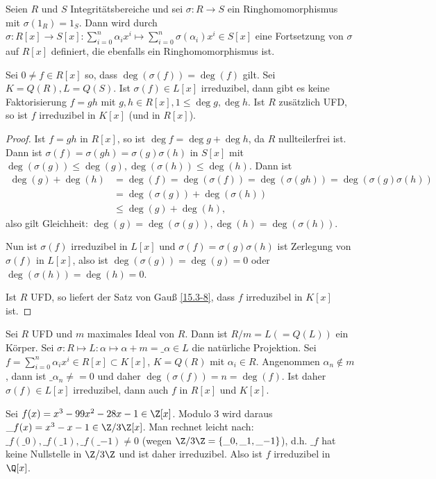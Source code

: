 \begin{st}[Reduktionskriterium] \label{15.3-12}
	Seien $R$ und $S$ Integritätsbereiche und sei $\sigma: R \to S$ ein Ringhomomorphismus mit $\sigma(1_R) = 1_S$.
	Dann wird durch $\sigma: R[x] \to S[x] : \sum_{i=0}^n \alpha_i x^i \mapsto \sum_{i=0}^n \sigma(\alpha_i) x^i \in S[x]$ eine Fortsetzung von $\sigma$ auf $R[x]$ definiert, die ebenfalls ein Ringhomomorphismus ist.

	Sei $0 \neq f \in R[x]$ so, dass $\deg(\sigma(f)) = \deg(f)$ gilt.
	Sei $K = Q(R), L = Q(S)$.
	Ist $\sigma(f) \in L[x]$ irreduzibel, dann gibt es keine Faktorisierung $f = gh$ mit $g, h \in R[x], 1 \le \deg g, \deg h$.
	Ist $R$ zusätzlich UFD, so ist $f$ irreduzibel in $K[x]$ (und in $R[x]$).
	\begin{proof}
		Ist $f = gh$ in $R[x]$, so ist $\deg f = \deg g + \deg h$, da $R$ nullteilerfrei ist.
		Dann ist $\sigma(f) = \sigma(gh) = \sigma(g)\sigma(h)$ in $S[x]$ mit $\deg(\sigma(g)) \le \deg(g), \deg(\sigma(h)) \le \deg(h)$.
		Dann ist
		\begin{align*}
			\deg(g) + \deg(h)
			&= \deg(f)
			= \deg(\sigma(f))
			= \deg(\sigma(gh))
			= \deg(\sigma(g)\sigma(h)) \\
			&= \deg(\sigma(g)) + \deg(\sigma(h)) \\
			&\le \deg(g) + \deg(h),
		\end{align*}
		also gilt Gleichheit: $\deg(g) = \deg(\sigma(g)), \deg(h) = \deg(\sigma(h))$.

		Nun ist $\sigma(f)$ irreduzibel in $L[x]$ und $\sigma(f) = \sigma(g)\sigma(h)$ ist Zerlegung von $\sigma(f)$ in $L[x]$, also ist $\deg(\sigma(g)) = \deg(g) = 0$ oder $\deg(\sigma(h)) = \deg(h) = 0$.

		Ist $R$ UFD, so liefert der Satz von Gauß \ref{15.3-8}, dass $f$ irreduzibel in $K[x]$ ist.
	\end{proof}
\end{st}

\begin{ex} \label{15.3-13}
	Sei $R$ UFD und $m$ maximales Ideal von $R$.
	Dann ist $R / m = L (= Q(L))$ ein Körper.
	Sei $\sigma: R \mapsto L: \alpha \mapsto \alpha + m = \_\alpha \in L$ die natürliche Projektion.
	Sei $f = \sum_{i=0}^n \alpha_i x^i \in R[x] \subset K[x]$, $K = Q(R)$ mit $\alpha_i \in R$.
	Angenommen $\alpha_n \not\in m$, dann ist $\_{\alpha_n} \neq= 0$ und daher $\deg(\sigma(f)) = n = \deg(f)$.
	Ist daher $\sigma(f) \in L[x]$ irreduzibel, dann auch $f$ in $R[x]$ und $K[x]$.
	\begin{ex*}
		Sei $f(x) = x^3 - 99x^2 - 28x - 1 \in \Z[x]$.
		Modulo 3 wird daraus $\_f(x) = x^3 - x - 1 \in \Z / 3\Z[x]$.
		Man rechnet leicht nach: $\_f(\_0), \_f(\_1), \_f(\_{-1}) \neq 0$ (wegen $\Z / 3\Z = \{\_0, \_1, \_{-1}\}$), d.h. $\_f$ hat keine Nullstelle in $\Z / 3\Z$ und ist daher irreduzibel.
		Also ist $f$ irreduzibel in $\Q[x]$.
	\end{ex*}
\end{ex}

